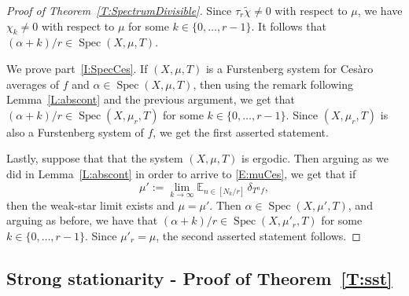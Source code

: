 \documentclass[11pt]{amsart}
\theoremstyle{definition}
\newcommand{\E}{{\mathbb E}}
\DeclareMathOperator{\spec}{Spec}
\begin{document}
\begin{proof}[Proof of Theorem~\ref{T:SpectrumDivisible}]
	 Since   $\tau_r\tilde{\chi}\neq 0$ with respect to $\mu$, we have     $\chi_k\neq 0$ with respect to $\mu$ for some $k\in \{0,\ldots, r-1\}$.  It follows that  $(\alpha+k)/r\in \spec(X,\mu,T)$.
		
We prove part~\eqref{I:SpecCes}.	If $(X,\mu,T)$ is a Furstenberg system for Ces\`aro averages of $f$ and $\alpha\in \spec(X,\mu,T)$,
		then using the remark following Lemma~\ref{L:abscont} and the previous argument,  we get that 	$(\alpha+k)/r\in \spec(X,\mu_r,T)$ for some $k\in \{0,\ldots, r-1\}$.	
Since $(X,\mu_r,T)$ is also a Furstenberg system of $f$, we get the first asserted statement.


	Lastly, suppose that that the system $(X,\mu,T)$ is ergodic. Then arguing as we did in  Lemma~\ref{L:abscont} in order to arrive to  \eqref{E:muCes}, we get that if
$$
\mu':=\lim_{k\to\infty} \E_{n\in [N_k/r]} \, \delta_{T^n f},
$$
then the weak-star limit exists and $\mu=\mu'$. Then $\alpha\in \spec(X,\mu',T)$, and arguing as before, we have that 	$(\alpha+k)/r\in \spec(X,\mu'_r,T)$ for some $k\in \{0,\ldots, r-1\}$.	
Since $\mu'_r=\mu$, the second asserted statement follows.
\end{proof}


	
	

	
	
	
	
	\subsection{Strong stationarity - Proof of Theorem~\ref{T:sst}}\label{SS:Proofsst}
	
\end{document}
